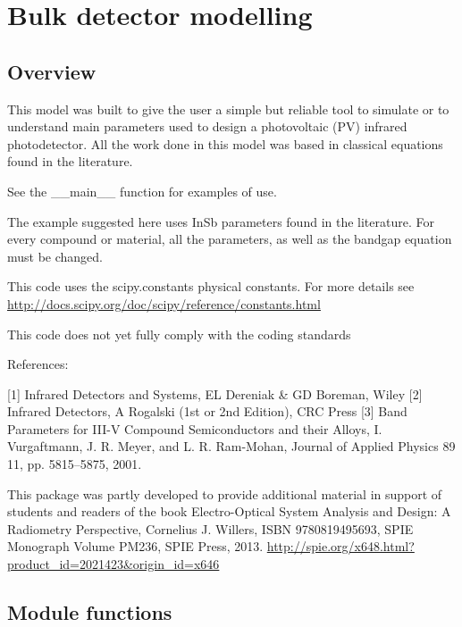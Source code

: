 \documentclass[a4paper,10pt,english]{sphinxmanual}
\begin{document}
\chapter{Bulk detector modelling}
\label{rydetector:bulk-detector-modelling}\label{rydetector::doc}

\section{Overview}
\label{rydetector:module-pyradi.rydetector}\label{rydetector:overview}
This model was built to give the user a simple but reliable tool to simulate or
to understand main parameters used to design a photovoltaic (PV) infrared
photodetector.  All the work done in this model was based in classical equations
found in the literature.

See the \_\_main\_\_ function for examples of use.

The example suggested here uses InSb parameters found in the literature. For
every compound or material, all the parameters, as well as the bandgap equation
must be changed.

This code uses the scipy.constants physical constants. For more details see
\href{http://docs.scipy.org/doc/scipy/reference/constants.html}{http://docs.scipy.org/doc/scipy/reference/constants.html}

This code does not yet fully comply with the coding standards

References:

{[}1{]} Infrared Detectors and Systems, EL Dereniak \& GD Boreman, Wiley
{[}2{]} Infrared Detectors, A Rogalski (1st or 2nd Edition), CRC Press
{[}3{]} Band Parameters for III-V Compound Semiconductors and their Alloys,
I. Vurgaftmann, J. R. Meyer, and L. R. Ram-Mohan,
Journal of Applied Physics 89 11, pp. 5815–5875, 2001.

This package was partly developed to provide additional material in support of students 
and readers of the book Electro-Optical System Analysis and Design: A Radiometry 
Perspective,  Cornelius J. Willers, ISBN 9780819495693, SPIE Monograph Volume
PM236, SPIE Press, 2013.  \href{http://spie.org/x648.html?product\_id=2021423\&origin\_id=x646}{http://spie.org/x648.html?product\_id=2021423\&origin\_id=x646}


\section{Module functions}
\label{rydetector:module-functions}
\end{document}
